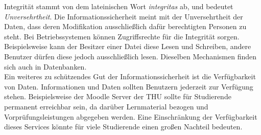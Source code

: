 \documentclass[
    12pt, %
    DIV10,
    ngerman, %
    a4paper, %
    oneside, %
    titlepage, %
    parskip=half, %
    headings=normal, %
    listof=totoc, %
    bibliography=totoc, %
    index=totoc, %
    captions=tableheading, %
    final %
]{scrreprt}
\begin{document}
Integrität stammt von dem lateinischen Wort \emph{integritas} ab, und bedeutet \emph{Unversehrtheit}. Die Informationssicherheit meint mit der Unversehrtheit der Daten, dass deren Modifikation ausschlie{\ss}lich dafür berechtigten Personen zu steht. Bei Betriebssystemen können Zugriffsrechte für die Integrität sorgen. Beispielsweise kann der Besitzer einer Datei diese Lesen und Schreiben, andere Benutzer dürfen diese jedoch ausschlie{\ss}lich lesen. Dieselben Mechanismen finden sich auch in Datenbanken.\\
Ein weiteres zu schützendes Gut der Informationssicherheit ist die Verfügbarkeit von Daten. Informationen und Daten sollten Benutzern jederzeit zur Verfügung stehen. Beispielsweise der Moodle Server der THU sollte für Studierende permanent erreichbar sein, da darüber Lernmaterial bezogen und Vorprüfungsleistungen abgegeben werden. Eine Einschränkung der Verfügbarkeit dieses Services könnte für viele Studierende einen gro{\ss}en Nachteil bedeuten.\\\\
\end{document}
